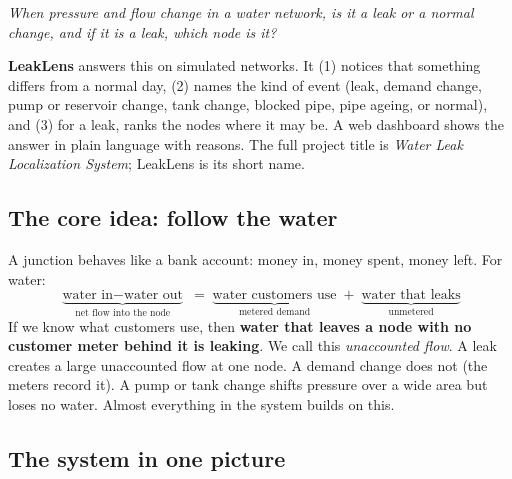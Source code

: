 \documentclass[11pt,a4paper]{article}
\begin{document}
\begin{key}\itshape When pressure and flow change in a water network, is it a leak or a normal change, and if it is a leak, which node is it?\end{key}

\textbf{LeakLens} answers this on simulated networks. It (1) notices that something differs from a normal day, (2) names the kind of event (leak, demand change, pump or reservoir change, tank change, blocked pipe, pipe ageing, or normal), and (3) for a leak, ranks the nodes where it may be. A web dashboard shows the answer in plain language with reasons. The full project title is \emph{Water Leak Localization System}; LeakLens is its short name.

\subsection{The core idea: follow the water}
A junction behaves like a bank account: money in, money spent, money left. For water:
\[\underbrace{\text{water in}-\text{water out}}_{\text{net flow into the node}}\;=\;\underbrace{\text{water customers use}}_{\text{metered demand}}\;+\;\underbrace{\text{water that leaks}}_{\text{unmetered}}\]
If we know what customers use, then \textbf{water that leaves a node with no customer meter behind it is leaking}. We call this \emph{unaccounted flow}. A leak creates a large unaccounted flow at one node. A demand change does not (the meters record it). A pump or tank change shifts pressure over a wide area but loses no water. Almost everything in the system builds on this.

\subsection{The system in one picture}
\begin{center}
\end{center}
\end{document}
